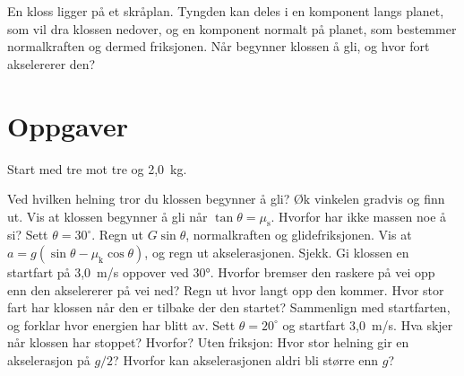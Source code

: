 \documentclass[11pt]{article}
\begin{document}

En kloss ligger på et skråplan. Tyngden kan deles i en komponent langs planet, som vil dra klossen nedover, og en komponent normalt på planet, som bestemmer normalkraften og dermed friksjonen. Når begynner klossen å gli, og hvor fort akselererer den?

\section*{Oppgaver}

Start med tre mot tre og 2,0~kg.

\begin{oppgaveliste}
\oppgave {}Ved hvilken helning tror du klossen begynner å gli? Øk vinkelen gradvis og finn ut.
\svar
\oppgave {}Vis at klossen begynner å gli når $\tan  θ = μ_{\mathrm{s}}$. Hvorfor har ikke massen noe å si?
\svar
\oppgave {}Sett $θ = 30^{\circ}$. Regn ut $G \sin  θ$, normalkraften og glidefriksjonen. Vis at $a = g(\sin  θ - μ_{\mathrm{k}} \cos  θ)$, og regn ut akselerasjonen. Sjekk.
\svar
\oppgave {}Gi klossen en startfart på 3,0~m/s oppover ved 30°. Hvorfor bremser den raskere på vei opp enn den akselererer på vei ned? Regn ut hvor langt opp den kommer.
\svar
\oppgave {}Hvor stor fart har klossen når den er tilbake der den startet? Sammenlign med startfarten, og forklar hvor energien har blitt av.
\svar
\oppgave {}Sett $θ = 20^{\circ}$ og startfart 3,0~m/s. Hva skjer når klossen har stoppet? Hvorfor?
\svar
\oppgave {}Uten friksjon: Hvor stor helning gir en akselerasjon på $g/2$? Hvorfor kan akselerasjonen aldri bli større enn $g$?
\svar
\end{oppgaveliste}
\end{document}
